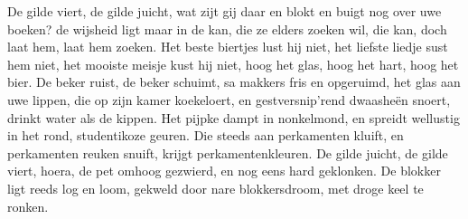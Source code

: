 \beginverse
De gilde viert, de gilde juicht,
wat zijt gij daar en blokt en buigt
nog over uwe boeken?
de wijsheid ligt maar in de kan,
die ze elders zoeken wil, die kan,
doch laat hem, laat hem zoeken.
\endverse
\beginchorus
Het beste biertjes lust hij niet,
het liefste liedje sust hem niet,
het mooiste meisje kust hij niet,
hoog het glas, hoog het hart, hoog het bier.
\endchorus
\beginverse
De beker ruist, de beker schuimt,
sa makkers fris en opgeruimd,
het glas aan uwe lippen,
die op zijn kamer koekeloert,
en gestversnip’rend dwaasheën snoert,
drinkt water als de kippen.
\endverse
\beginverse
Het pijpke dampt in nonkelmond,
en spreidt wellustig in het rond,
studentikoze geuren.
Die steeds aan perkamenten kluift,
en perkamenten reuken snuift,
krijgt perkamentenkleuren.
\endverse
\beginverse
De gilde juicht, de gilde viert,
hoera, de pet omhoog gezwierd,
en nog eens hard geklonken.
De blokker ligt reeds log en loom,
gekweld door nare blokkersdroom,
met droge keel te ronken.
\endverse
\endsong